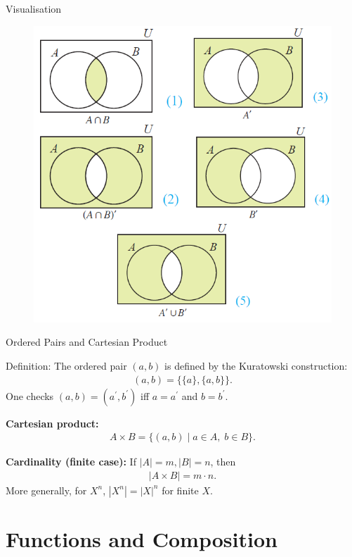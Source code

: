 \begin{frame}{Visualisation}
\begin{figure}
    \centering
    \includegraphics[width=0.7\linewidth]{Image3.png}
\end{figure}
\end{frame}

\begin{frame}{Ordered Pairs and Cartesian Product}
\begin{block}{Definition:} The ordered pair \((a,b)\) is defined by the Kuratowski construction:
\begin{align*}
(a,b) = \{ \{a\}, \{a,b\} \}.
\end{align*}
One checks \((a,b) = (a^{'},b^{'})\) iff \(a=a^{'}\) and \(b=b^{'}\).

\medskip

\textbf{Cartesian product:}
\begin{align*}
A \times B = \{ (a,b) \mid a \in A,\; b \in B \}.
\end{align*}

\medskip

\textbf{Cardinality (finite case):} If \(|A| = m, |B| = n\), then
\begin{align*}
|A \times B| = m \cdot n.
\end{align*}
More generally, for \(X^n\), \(|X^n| = |X|^n\) for finite \(X\).
\end{block}
\end{frame}

\section{Functions and Composition}

